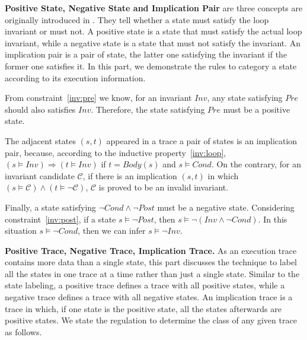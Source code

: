 \medskip\noindent
\textbf{Positive State, Negative State and Implication Pair}
are three concepts are originally introduced in \cite{sharma2014invariant}.
They tell whether a state must satisfy the loop invariant or must not.
A positive state is a state that must satisfy the actual loop invariant,
while a negative state is a state that must not satisfy the invariant.
An implication pair is a pair of state, the latter one satisfying the invariant 
if the former one satisfies it. 
In this part, we demonstrate the rules to category a state according to its execution information.


From constraint~\ref{inv:pre} we know, for an invariant $Inv$, 
any state satisfying $Pre$ should also satisfies $Inv$. 
Therefore, the state satisfying $Pre$ must be a positive state. 

The adjacent states $(s, t)$ appeared in a trace a pair of states is an implication pair,
because, according to the inductive property~\ref{inv:loop},
$(s \models Inv) \Rightarrow (t \models {Inv})$
if $t = Body(s)$ and $s \models Cond$.
On the contrary, for an invariant candidate $\mathcal{C}$, 
if there is an implication $(s, t)$ in which $(s \models \mathcal{C}) \wedge (t \models \neg \mathcal{C})$,
$\mathcal{C}$ is proved to be an invalid invariant.

Finally, a state satisfying $\neg{Cond} \wedge \neg{Post}$ must be a negative state.
Considering constraint~\ref{inv:post}, if a state $s \models \neg{Post}$,
then $s \models \neg(Inv \wedge \neg Cond)$.
In this situation $s \models \neg Cond$, then we can infer $s \models \neg Inv$. 

\medskip\noindent
\textbf{Positive Trace, Negative Trace, Implication Trace.}
As an execution trace contains more data than a single state,
this part discusses the technique to label all the states in one trace at a time rather than just a single state.
Similar to the state labeling, a positive trace defines a trace with all positive states,
while a negative trace defines a trace with all negative states.
An implication trace is a trace in which, if one state is the positive state, 
all the states afterwards are positive states.
We state the regulation to determine the class of any given trace as follows.

